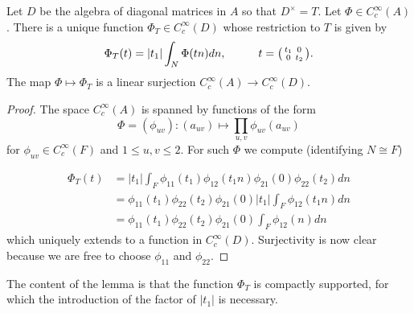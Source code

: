\begin{lemma}\label{lemma:phiT}
    Let $D$ be the algebra of diagonal matrices in $A$ so that $D^\times =T$. Let $\Phi \in C_c^\infty(A)$. There is a unique function $\Phi_T \in C_c^\infty(D)$ whose restriction to $T$ is given by 
    $$\Phi_T(t) = |t_1| \int_N \Phi(tn)dn, \hspace{1cm} t=\begin{psmallmatrix}
        t_1 & 0\\0&t_2
    \end{psmallmatrix}.$$
    The map $\Phi \mapsto \Phi_T$ is a linear surjection $C_c^\infty(A) \to C_c^\infty (D)$.
\end{lemma}
\begin{proof}
    The space $C_c^\infty(A)$ is spanned by functions of the form 
    $$\Phi = (\phi_{uv}): (a_{uv}) \mapsto \prod\limits_{u,v} \phi_{uv}(a_{uv})$$
    for $\phi_{uv} \in C_c^\infty (F)$ and $1 \leq u,v \leq 2$. For such $\Phi$ we compute (identifying $N \cong F$)
    
    \begin{equation*}
        \begin{split}
            \Phi_T(t) &= |t_1| \int_F \phi_{11}(t_1)\phi_{12}(t_1n)\phi_{21}(0)\phi_{22}(t_2)dn \\
            &= \phi_{11}(t_1)\phi_{22}(t_2)\phi_{21}(0) |t_1|\int_F \phi_{12}(t_1n) dn \\
            &= \phi_{11}(t_1)\phi_{22}(t_2)\phi_{21}(0) \int_F \phi_{12}(n) dn
        \end{split}
    \end{equation*}
    which uniquely extends to a function in $C_c^\infty(D)$. Surjectivity is now clear because we are free to choose $\phi_{11}$ and $\phi_{22}$.
\end{proof}
\begin{rem}
    The content of the lemma is that the function $\Phi_T$ is compactly supported, for which the introduction of the factor of $|t_1|$ is necessary.
\end{rem}

